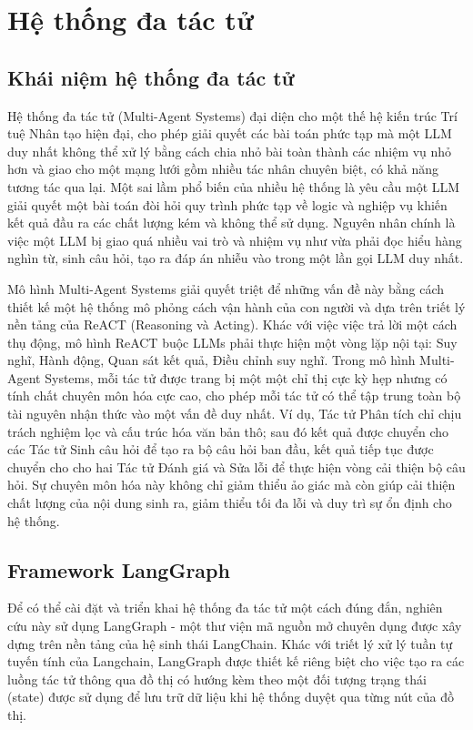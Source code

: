 \section{Hệ thống đa tác tử}

\subsection{Khái niệm hệ thống đa tác tử}

Hệ thống đa tác tử (Multi-Agent Systems) đại diện cho một thế hệ kiến trúc Trí tuệ Nhân tạo hiện đại, cho phép giải quyết các bài toán phức tạp mà một LLM duy nhất không thể xử lý bằng cách chia nhỏ bài toàn thành các nhiệm vụ nhỏ hơn và giao cho một mạng lưới gồm nhiều tác nhân chuyên biệt, có khả năng tương tác qua lại. Một sai lầm phổ biến của nhiều hệ thống là yêu cầu một LLM giải quyết một bài toán đòi hỏi quy trình phức tạp về logic và nghiệp vụ khiến kết quả đầu ra các chất lượng kém và không thể sử dụng. Nguyên nhân chính là việc một LLM bị giao quá nhiều vai trò và nhiệm vụ như vừa phải đọc hiểu hàng nghìn từ, sinh câu hỏi, tạo ra đáp án nhiễu vào trong một lần gọi LLM duy nhất.

Mô hình Multi-Agent Systems giải quyết triệt để những vấn đề này bằng cách thiết kế một hệ thống mô phỏng cách vận hành của con người và dựa trên triết lý nền tảng của ReACT (Reasoning và Acting). Khác với việc việc trả lời một cách thụ động, mô hình ReACT buộc LLMs phải thực hiện một vòng lặp nội tại: Suy nghĩ, Hành động, Quan sát kết quả, Điều chỉnh suy nghĩ. Trong mô hình Multi-Agent Systems, mỗi tác tử được trang bị một một chỉ thị cực kỳ hẹp nhưng có tính chất chuyên môn hóa cực cao, cho phép mỗi tác tử có thể tập trung toàn bộ tài nguyên nhận thức vào một vấn đề duy nhất. Ví dụ, Tác tử Phân tích chỉ chịu trách nghiệm lọc và cấu trúc hóa văn bản thô; sau đó kết quả được chuyển cho các Tác tử Sinh câu hỏi để tạo ra bộ câu hỏi ban đầu, kết quả tiếp tục được chuyển cho cho hai Tác tử Đánh giá và Sửa lỗi để thực hiện vòng cải thiện bộ câu hỏi. Sự chuyên môn hóa này không chỉ giảm thiểu ảo giác mà còn giúp cải thiện chất lượng của nội dung sinh ra, giảm thiểu tối đa lỗi và duy trì sự ổn định cho hệ thống.

\subsection{Framework LangGraph}

Để có thể cài đặt và triển khai hệ thống đa tác tử một cách đúng đắn, nghiên cứu này sử dụng LangGraph - một thư viện mã nguồn mở chuyên dụng được xây dựng trên nền tảng của hệ sinh thái LangChain. Khác với triết lý xử lý tuần tự tuyến tính của Langchain, LangGraph được thiết kế riêng biệt cho việc tạo ra các luồng tác tử thông qua đồ thị có hướng kèm theo một đối tượng trạng thái (state) được sử dụng để lưu trữ dữ liệu khi hệ thống duyệt qua từng nút của đồ thị.

